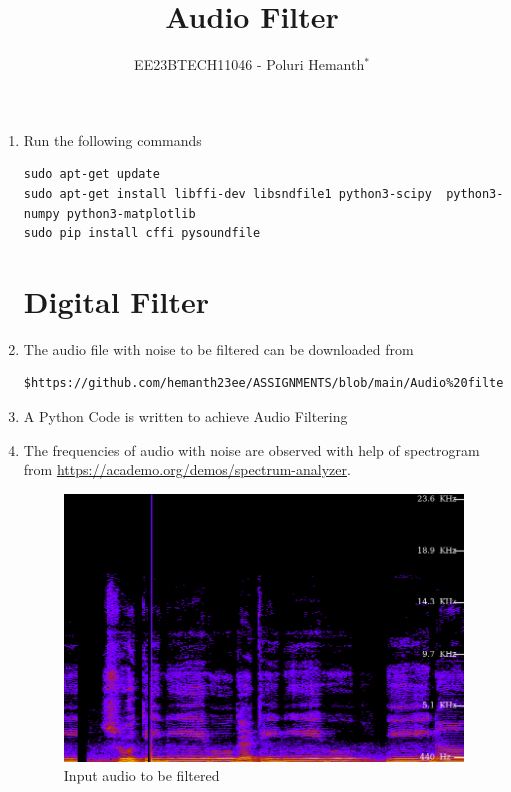 \documentclass[journal,12pt,twocolumn]{IEEEtran}
\theoremstyle{remark}
\begin{document}

\vspace{3cm}
\title{Audio Filter}
\author{EE23BTECH11046 - Poluri Hemanth$^{*}$%
}
\maketitle
\newpage
\bigskip
\renewcommand{\thefigure}{\arabic{figure}}
\renewcommand{\thetable}{\theenumi}


\begin{enumerate}

\section{SOFTWARE INSTALLATION}
\item Run the following commands
\begin{lstlisting}
sudo apt-get update
sudo apt-get install libffi-dev libsndfile1 python3-scipy  python3-numpy python3-matplotlib 
sudo pip install cffi pysoundfile 
\end{lstlisting}
\section{Digital Filter}
\label{original_audio}
\item The audio file with noise to be filtered can be downloaded from
\begin{lstlisting}
$https://github.com/hemanth23ee/ASSIGNMENTS/blob/main/Audio%20filter%20assignment/codes/Song.wav
\end{lstlisting}
\item 
\label{code_filtering}
A Python Code is written to achieve Audio Filtering 
\label{audio_filter.46}

\item 
\label{Visualization}


The frequencies of audio with noise are observed with help of spectrogram from \href{https://academo.org/demos/spectrum-analyzer}{\url{https://academo.org/demos/spectrum-analyzer}}.\\

\begin{figure}[H]
    \includegraphics[width=1\columnwidth]{figs/original.46.png }
    \caption{Input audio to be filtered}
\end{figure}


\end{enumerate}
\end{document}
